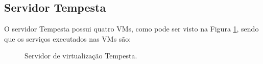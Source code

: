 \subsection{Servidor Tempesta}
\label{section:serv_tempesta}

O servidor Tempesta possui quatro \ac{VM}s, como pode ser visto na Figura \ref{fig:servidor_tempesta}, sendo que os serviços executados nas 
\ac{VM}s são:

\begin{figure}[h!]
 \centering
 \caption{Servidor de virtualização Tempesta.}
 \label{fig:servidor_tempesta}
\end{figure}

